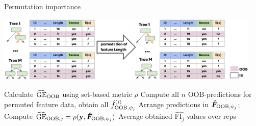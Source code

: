 \documentclass[11pt,compress,t,notes=noshow, xcolor=table]{beamer}
\begin{document}
\begin{frame2}{Permutation importance}

\includegraphics[width = 0.95\textwidth]{figure_man/forest-permutation-imp.png}
\vspace{-1.2ex}
\begin{algorithm}[H]
\footnotesize
\begin{algorithmic}[1]
  \State Calculate $\widehat{\mathrm{GE}}_{\mathrm{OOB}}$ using set-based metric $\rho$
	  \State Compute all $n$ OOB-predictions for permuted feature data, obtain all $\hat{f}^{(i)}_{\mathrm{OOB},\psi_j}$
    \State Arrange predictions in $\bm{\hat{F}}_{\mathrm{OOB},\psi_j}$;
    Compute $\widehat{\mathrm{GE}}_{\mathrm{OOB}, j} = \rho(\mathbf{y}, \bm{\hat{F}}_{\mathrm{OOB},\psi_j})$
  \EndFor
  \State Average obtained $\widehat{\text{FI}_j}$ values over reps
  \EndFor
\end{algorithmic}
\end{algorithm}
\vspace{-3ex}
\end{frame2}
\end{document}
